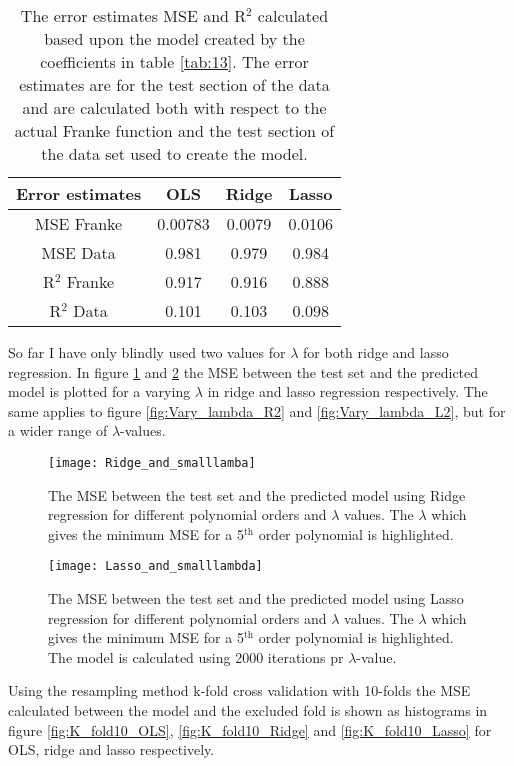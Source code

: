 \documentclass[uio,jmp,amsmath,amssymb,reprint,nofootinbib]{revtex4-1}
\numberwithin{equation}{section}
\begin{document}
\begin{table}
\begin{tabular}{|c|c|c|c|}\hline
Error estimates & OLS & Ridge & Lasso\\ \hline
MSE Franke & 0.00783 & 0.0079 & 0.0106 \\ \hline
MSE Data & 0.981 & 0.979 & 0.984 \\ \hline
R\(^2\) Franke & 0.917 & 0.916 & 0.888 \\ \hline
R\(^2\) Data & 0.101 & 0.103 & 0.098 \\ \hline
\end{tabular}
\caption{The error estimates MSE and R\(^2\) calculated based upon the model created by the coefficients in table \ref{tab:13}. The error estimates are for the test section of the data and are calculated both with respect to the actual Franke function and the test section of the data set used to create the model.}
\label{tab:05}
\end{table}

So far I have only blindly used two values for \(\lambda\) for both ridge and lasso regression. In figure \ref{fig:Vary_lambda_R} and \ref{fig:Vary_lambda_L} the MSE between the test set and the predicted model is plotted for a varying \(\lambda\) in ridge and lasso regression respectively. The same applies to figure \ref{fig:Vary_lambda_R2} and \ref{fig:Vary_lambda_L2}, but for a wider range of \(\lambda\)-values.

\begin{figure}[H]
    \centering
    \texttt{[image: Ridge\_and\_smalllamba]}
    \caption{The MSE between the test set and the predicted model using Ridge regression for different polynomial orders and \(\lambda\) values. The \(\lambda\) which gives the minimum MSE for a 5\(^\text{th}\) order polynomial is highlighted.}
    \label{fig:Vary_lambda_R}
\end{figure}

\begin{figure}[H]
    \centering
    \texttt{[image: Lasso\_and\_smalllambda]}
    \caption{The MSE between the test set and the predicted model using Lasso regression for different polynomial orders and \(\lambda\) values. The \(\lambda\) which gives the minimum MSE for a 5\(^\text{th}\) order polynomial is highlighted. The model is calculated using 2000 iterations pr \(\lambda\)-value.}
    \label{fig:Vary_lambda_L}
\end{figure}

Using the resampling method k-fold cross validation with 10-folds the MSE calculated between the model and the excluded fold is shown as histograms in figure \ref{fig:K_fold10_OLS}, \ref{fig:K_fold10_Ridge} and \ref{fig:K_fold10_Lasso} for OLS, ridge and lasso respectively.
\end{document}
